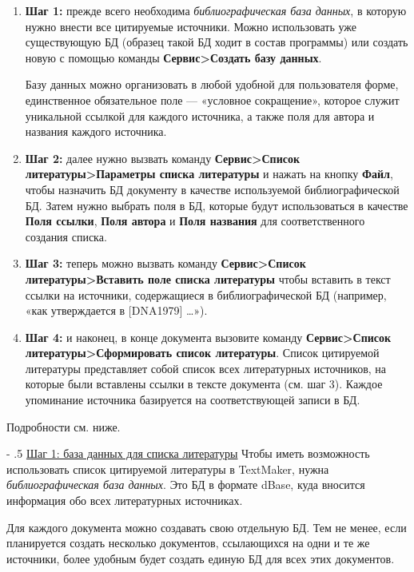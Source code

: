 ﻿\documentclass[a4paper,10pt]{article}
\makeatletter
\renewcommand\paragraph{%
   \@startsection{paragraph}{4}{0mm}%
      {-\baselineskip}%
      {.5\baselineskip}%
      {\normalfont\normalsize\bfseries}}
\makeatother
\begin{document}
\begin{enumerate}
 \item \textbf{Шаг 1:} прежде всего необходима \textit{библиографическая база данных}, в которую нужно внести все цитируемые источники. Можно использовать уже существующую БД (образец такой БД ходит в состав программы) или создать новую с помощью команды \textbf{Сервис>Создать базу данных}.
 
 Базу данных можно организовать в любой удобной для пользователя форме, единственное обязательное поле — «условное сокращение», которое служит уникальной ссылкой для каждого источника, а также поля для автора и названия каждого источника.
 \item \textbf{Шаг 2:} далее нужно вызвать команду \textbf{Сервис>Список литературы>Параметры списка литературы} и нажать на кнопку \textbf{Файл}, чтобы назначить БД документу в качестве используемой библиографической БД. Затем нужно выбрать поля в БД, которые будут использоваться в качестве \textbf{Поля ссылки}, \textbf{Поля автора} и \textbf{Поля названия} для соответственного создания списка. 
 \item \textbf{Шаг 3:} теперь можно вызвать команду \textbf{Сервис>Список литературы>Вставить поле списка литературы} чтобы вставить  в текст ссылки на источники, содержащиеся в библиографической БД (например, «как утверждается в [DNA1979] …»).
 \item \textbf{Шаг 4:} и наконец, в конце документа вызовите команду \textbf{Сервис>Список литературы>Сформировать список литературы}. Список цитируемой литературы представляет собой список всех литературных источников, на которые были вставлены ссылки в тексте документа (см. шаг 3). Каждое упоминание источника базируется на соответствующей записи в БД.
\end{enumerate}

Подробности см. ниже.

\paragraph{\underline{Шаг 1: база данных для списка литературы}}
Чтобы иметь возможность использовать список цитируемой литературы в TextMaker, нужна \textit{библиографическая база данных}. Это БД в формате dBase, куда вносится информация обо всех литературных источниках.

Для каждого документа можно создавать свою отдельную БД. Тем не менее, если планируется создать несколько документов, ссылающихся на одни и те же источники, более удобным будет создать единую БД для всех этих документов.
\end{document}
